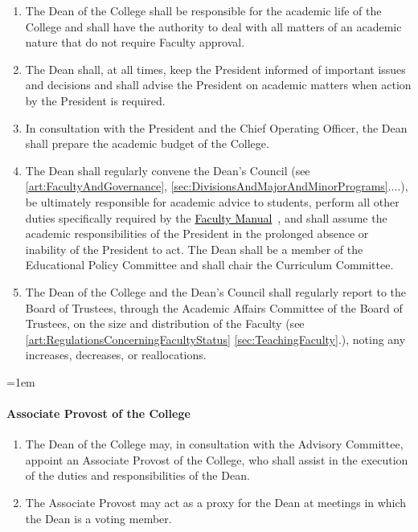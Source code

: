 \documentclass{manual}
\newcommand{\keyword}[1]{\textcolor{black}{#1}}
\newcommand{\facman}{\keyword{\underline{Faculty Manual}}~}
\let\oldparagraph\paragraph
\renewcommand\paragraph{\leftskip=1em\oldparagraph}
\newcommand{\itemLevelA}{\alph*.}
\newcommand{\itemRefA}{\alph*}
\begin{document}
\begin{enumerate}[label=\itemLevelA,ref=\itemRefA]
\item The Dean of the College shall be responsible for the academic life of the College and shall have the authority to deal with all matters of an academic nature that do not require Faculty approval.
\item The Dean shall, at all times, keep the President informed of important issues and decisions and shall advise the President on academic matters when action by the President is required.
\item In consultation with the President and the Chief Operating Officer, the Dean shall prepare the academic budget of the College.
\item The Dean shall regularly convene the Dean's Council (see \cref{art:FacultyAndGovernance}, \cref{sec:DivisionsAndMajorAndMinorPrograms}....), be ultimately responsible for academic advice to students, perform all other duties specifically required by the \facman, and shall assume the academic responsibilities of the President in the prolonged absence or inability of the President to act. The Dean shall be a member of the Educational Policy Committee and shall chair the Curriculum Committee.
\item The Dean of the College and the Dean's Council shall regularly report to the Board of Trustees, through the Academic Affairs Committee of the Board of Trustees, on the size and distribution of the Faculty (see \cref{art:RegulationsConcerningFacultyStatus} \cref{sec:TeachingFaculty}.), noting any increases, decreases, or reallocations.
\end{enumerate}

\paragraph{Associate Provost of the College}
\begin{enumerate}[label=\itemLevelA,ref=\itemRefA]
\item The Dean of the College may,  in consultation with the Advisory Committee, appoint an Associate Provost of the College, who shall assist in the execution of the duties and responsibilities of the Dean.
\item The Associate Provost may act as a proxy for the Dean at meetings in which the Dean is a voting member.
\end{enumerate}
\end{document}
